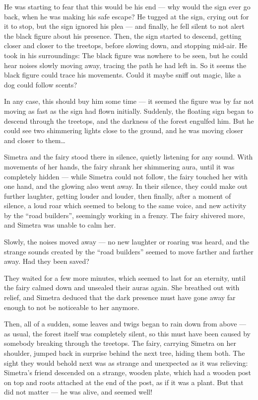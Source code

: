He was starting to fear that this would be his end --- why would the sign ever go back, when he was making his safe escape? He tugged at the sign, crying out for it to stop, but the sign ignored his plea --- and finally, he fell silent to not alert the black figure about his presence. Then, the sign started to descend, getting closer and closer to the treetops, before slowing down, and stopping mid-air. He took in his surroundings: The black figure was nowhere to be seen, but he could hear noises slowly moving away, tracing the path he had left in. So it seems the black figure could trace his movements. Could it maybe sniff out magic, like a dog could follow scents?

In any case, this should buy him some time --- it seemed the figure was by far not moving as fast as the sign had flown initially. Suddenly, the floating sign began to descend through the treetops, and the darkness of the forest engulfed him. But he could see two shimmering lights close to the ground, and he was moving closer and closer to them\dots{}

\fancybreaker{}

Simetra and the fairy stood there in silence, quietly listening for any sound. With movements of her hands, the fairy shrank her shimmering aura, until it was completely hidden --- while Simetra could not follow, the fairy touched her with one hand, and the glowing also went away. In their silence, they could make out further laughter, getting louder and louder, then finally, after a moment of silence, a loud roar which seemed to belong to the same voice, and new activity by the \enquote{road builders}, seemingly working in a frenzy. The fairy shivered more, and Simetra was unable to calm her.

Slowly, the noises moved away --- no new laughter or roaring was heard, and the strange sounds created by the \enquote{road builders} seemed to move farther and farther away. Had they been saved?

They waited for a few more minutes, which seemed to last for an eternity, until the fairy calmed down and unsealed their auras again. She breathed out with relief, and Simetra deduced that the dark presence must have gone away far enough to not be noticeable to her anymore.

Then, all of a sudden, some leaves and twigs began to rain down from above --- as usual, the forest itself was completely silent, so this must have been caused by somebody breaking through the treetops. The fairy, carrying Simetra on her shoulder, jumped back in surprise behind the next tree, hiding them both. The sight they would behold next was as strange and unexpected as it was relieving: Simetra's friend descended on a strange, wooden plate, which had a wooden post on top and roots attached at the end of the post, as if it was a plant. But that did not matter --- he was alive, and seemed well!

